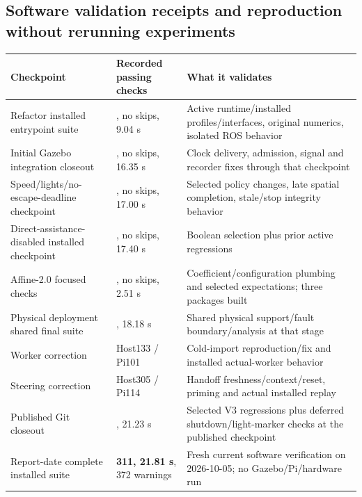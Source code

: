 \documentclass[
  10pt,
  letterpaper,
]{article}
\newcounter{none} %
\begin{document}
\subsection{Software validation receipts and reproduction without
rerunning
experiments}\label{software-validation-receipts-and-reproduction-without-rerunning-experiments}

{\def\LTcaptype{none} %
\begin{longtable}[]{@{}
  >{\raggedright\arraybackslash}p{}
  >{\raggedleft\arraybackslash}p{}
  >{\raggedright\arraybackslash}p{}@{}}
\toprule\noalign{}
\begin{minipage}[b]{\linewidth}\raggedright
Checkpoint
\end{minipage} & \begin{minipage}[b]{\linewidth}\raggedleft
Recorded passing checks
\end{minipage} & \begin{minipage}[b]{\linewidth}\raggedright
What it validates
\end{minipage} \\
\midrule\noalign{}
\endhead
\bottomrule\noalign{}
\endlastfoot
Refactor installed entrypoint suite & 196, no skips, 9.04 s & Active
runtime/installed profiles/interfaces, original numerics, isolated ROS
behavior \\
Initial Gazebo integration closeout & 228, no skips, 16.35 s & Clock
delivery, admission, signal and recorder fixes through that
checkpoint \\
Speed/lights/no-escape-deadline checkpoint & 240, no skips, 17.00 s &
Selected policy changes, late spatial completion, stale/stop integrity
behavior \\
Direct-assistance-disabled installed checkpoint & 249, no skips, 17.40 s
& Boolean selection plus prior active regressions \\
Affine-2.0 focused checks & 126, no skips, 2.51 s &
Coefficient/configuration plumbing and selected expectations; three
packages built \\
Physical deployment shared final suite & 297, 18.18 s & Shared physical
support/fault boundary/analysis at that stage \\
Worker correction & Host133 / Pi101 & Cold-import reproduction/fix and
installed actual-worker behavior \\
Steering correction & Host305 / Pi114 & Handoff freshness/context/reset,
priming and actual installed replay \\
Published Git closeout & 311, 21.23 s & Selected V3 regressions plus
deferred shutdown/light-marker checks at the published checkpoint \\
Report-date complete installed suite & \textbf{311, 21.81 s}, 372
warnings & Fresh current software verification on 2026-10-05; no
Gazebo/Pi/hardware run \\
\end{longtable}
}
\end{document}
